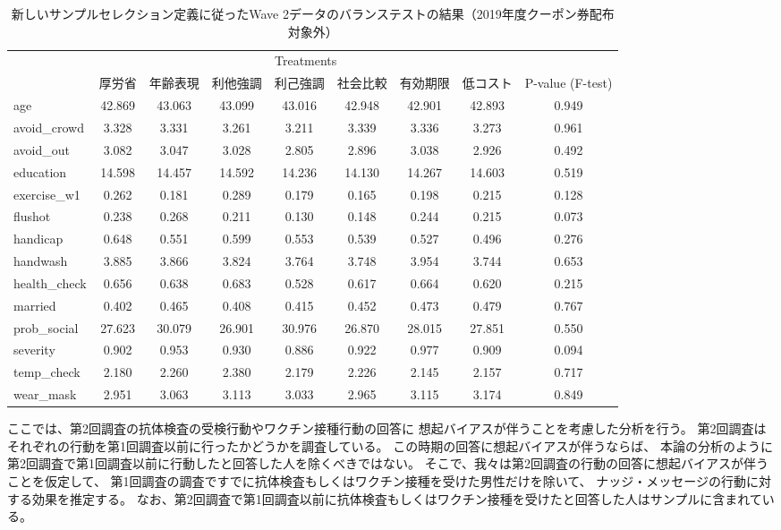 \documentclass[
  11pt,
  a4paper,
]{article}
\begin{document}
\begin{table}

\caption{\label{tab:c1balancetestw2coupon0}新しいサンプルセレクション定義に従ったWave 2データのバランステストの結果（2019年度クーポン券配布対象外）}
\centering
\fontsize{9}{11}\selectfont
\begin{tabular}[t]{lcccccccc}
\toprule
\multicolumn{1}{c}{ } & \multicolumn{7}{c}{Treatments} & \multicolumn{1}{c}{ } \\
\cmidrule(l{3pt}r{3pt}){2-8}
  & 厚労省 & 年齢表現 & 利他強調 & 利己強調 & 社会比較 & 有効期限 & 低コスト & P-value (F-test)\\
\midrule
age & 42.869 & 43.063 & 43.099 & 43.016 & 42.948 & 42.901 & 42.893 & 0.949\\
avoid\_crowd & 3.328 & 3.331 & 3.261 & 3.211 & 3.339 & 3.336 & 3.273 & 0.961\\
avoid\_out & 3.082 & 3.047 & 3.028 & 2.805 & 2.896 & 3.038 & 2.926 & 0.492\\
education & 14.598 & 14.457 & 14.592 & 14.236 & 14.130 & 14.267 & 14.603 & 0.519\\
exercise\_w1 & 0.262 & 0.181 & 0.289 & 0.179 & 0.165 & 0.198 & 0.215 & 0.128\\
flushot & 0.238 & 0.268 & 0.211 & 0.130 & 0.148 & 0.244 & 0.215 & 0.073\\
handicap & 0.648 & 0.551 & 0.599 & 0.553 & 0.539 & 0.527 & 0.496 & 0.276\\
handwash & 3.885 & 3.866 & 3.824 & 3.764 & 3.748 & 3.954 & 3.744 & 0.653\\
health\_check & 0.656 & 0.638 & 0.683 & 0.528 & 0.617 & 0.664 & 0.620 & 0.215\\
married & 0.402 & 0.465 & 0.408 & 0.415 & 0.452 & 0.473 & 0.479 & 0.767\\
prob\_social & 27.623 & 30.079 & 26.901 & 30.976 & 26.870 & 28.015 & 27.851 & 0.550\\
severity & 0.902 & 0.953 & 0.930 & 0.886 & 0.922 & 0.977 & 0.909 & 0.094\\
temp\_check & 2.180 & 2.260 & 2.380 & 2.179 & 2.226 & 2.145 & 2.157 & 0.717\\
wear\_mask & 2.951 & 3.063 & 3.113 & 3.033 & 2.965 & 3.115 & 3.174 & 0.849\\
\bottomrule
\end{tabular}
\end{table}

ここでは、第2回調査の抗体検査の受検行動やワクチン接種行動の回答に
想起バイアスが伴うことを考慮した分析を行う。
第2回調査はそれぞれの行動を第1回調査以前に行ったかどうかを調査している。
この時期の回答に想起バイアスが伴うならば、
本論の分析のように第2回調査で第1回調査以前に行動したと回答した人を除くべきではない。
そこで、我々は第2回調査の行動の回答に想起バイアスが伴うことを仮定して、
第1回調査の調査ですでに抗体検査もしくはワクチン接種を受けた男性だけを除いて、
ナッジ・メッセージの行動に対する効果を推定する。
なお、第2回調査で第1回調査以前に抗体検査もしくはワクチン接種を受けたと回答した人はサンプルに含まれている。
\end{document}
